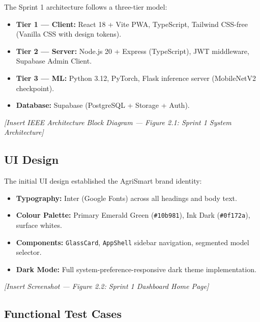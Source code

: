 \documentclass[12pt,a4paper]{report}
\begin{document}
The Sprint 1 architecture follows a three-tier model:

\begin{itemize}
  \item \textbf{Tier 1 — Client:} React 18 + Vite PWA, TypeScript, Tailwind CSS-free (Vanilla CSS with design tokens).
  \item \textbf{Tier 2 — Server:} Node.js 20 + Express (TypeScript), JWT middleware, Supabase Admin Client.
  \item \textbf{Tier 3 — ML:} Python 3.12, PyTorch, Flask inference server (MobileNetV2 checkpoint).
  \item \textbf{Database:} Supabase (PostgreSQL + Storage + Auth).
\end{itemize}

\textit{[Insert IEEE Architecture Block Diagram — Figure 2.1: Sprint 1 System Architecture]}

\subsection{UI Design}
The initial UI design established the AgriSmart brand identity:

\begin{itemize}
  \item \textbf{Typography:} Inter (Google Fonts) across all headings and body text.
  \item \textbf{Colour Palette:} Primary Emerald Green (\texttt{\#10b981}), Ink Dark (\texttt{\#0f172a}), surface whites.
  \item \textbf{Components:} \texttt{GlassCard}, \texttt{AppShell} sidebar navigation, segmented model selector.
  \item \textbf{Dark Mode:} Full system-preference-responsive dark theme implementation.
\end{itemize}

\textit{[Insert Screenshot — Figure 2.2: Sprint 1 Dashboard Home Page]}

\subsection{Functional Test Cases}
\end{document}
